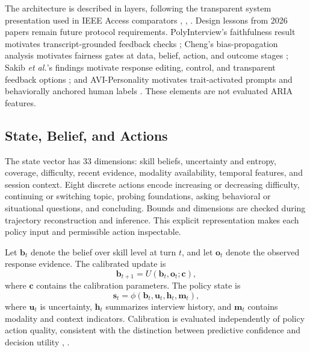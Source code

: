 \documentclass[journal]{IEEEtran}
\begin{document}
The architecture is described in layers, following the transparent system presentation used in IEEE Access comparators \cite{kim2023fairness}, \cite{putra2024magbert}, \cite{suen2019personality}. Design lessons from 2026 papers remain future protocol requirements. PolyInterview's faithfulness result motivates transcript-grounded feedback checks \cite{wen2026polyinterview}; Cheng's bias-propagation analysis motivates fairness gates at data, belief, action, and outcome stages \cite{cheng2026fairness}; Sakib \emph{et al.}'s findings motivate response editing, control, and transparent feedback options \cite{sakib2026expecting}; and AVI-Personality motivates trait-activated prompts and behaviorally anchored human labels \cite{zhang2026avipersonality}. These elements are not evaluated ARIA features.


\subsection{State, Belief, and Actions}

The state vector has 33 dimensions: skill beliefs, uncertainty and entropy, coverage, difficulty, recent evidence, modality availability, temporal features, and session context. Eight discrete actions encode increasing or decreasing difficulty, continuing or switching topic, probing foundations, asking behavioral or situational questions, and concluding. Bounds and dimensions are checked during trajectory reconstruction and inference. This explicit representation makes each policy input and permissible action inspectable.


Let $\mathbf{b}_t$ denote the belief over skill level at turn $t$, and let $\mathbf{o}_t$ denote the observed response evidence. The calibrated update is
\begin{equation}
\mathbf{b}_{t+1}=U(\mathbf{b}_t,\mathbf{o}_t;\mathbf{c}),
\label{eq:belief-update}
\end{equation}
where $\mathbf{c}$ contains the calibration parameters. The policy state is
\begin{equation}
\mathbf{s}_t=\phi(\mathbf{b}_t,\mathbf{u}_t,\mathbf{h}_t,\mathbf{m}_t),
\label{eq:state-construction}
\end{equation}
where $\mathbf{u}_t$ is uncertainty, $\mathbf{h}_t$ summarizes interview history, and $\mathbf{m}_t$ contains modality and context indicators. Calibration is evaluated independently of policy action quality, consistent with the distinction between predictive confidence and decision utility \cite{guo2017calibration}, \cite{malinin2017uncertainty}.
\end{document}
